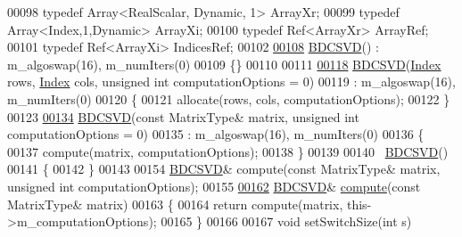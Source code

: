\begin{DoxyCode}
00098   \textcolor{keyword}{typedef} Array<RealScalar, Dynamic, 1> ArrayXr;
00099   \textcolor{keyword}{typedef} Array<Index,1,Dynamic> ArrayXi;
00100   \textcolor{keyword}{typedef} Ref<ArrayXr> ArrayRef;
00101   \textcolor{keyword}{typedef} Ref<ArrayXi> IndicesRef;
00102 
\hyperlink{group___s_v_d___module_a39514816d38f9c418cf3f3514b511c2c}{00108}   \hyperlink{group___s_v_d___module_a39514816d38f9c418cf3f3514b511c2c}{BDCSVD}() : m\_algoswap(16), m\_numIters(0)
00109   \{\}
00110 
00111 
\hyperlink{group___s_v_d___module_a3e1fa48b3d042b7daf7392724a68bb60}{00118}   \hyperlink{group___s_v_d___module_a3e1fa48b3d042b7daf7392724a68bb60}{BDCSVD}(\hyperlink{namespace_eigen_a62e77e0933482dafde8fe197d9a2cfde}{Index} rows, \hyperlink{namespace_eigen_a62e77e0933482dafde8fe197d9a2cfde}{Index} cols, \textcolor{keywordtype}{unsigned} \textcolor{keywordtype}{int} computationOptions = 0)
00119     : m\_algoswap(16), m\_numIters(0)
00120   \{
00121     allocate(rows, cols, computationOptions);
00122   \}
00123 
\hyperlink{group___s_v_d___module_a302746d9c534cd513c1df87c7ae4850d}{00134}   \hyperlink{group___s_v_d___module_a302746d9c534cd513c1df87c7ae4850d}{BDCSVD}(\textcolor{keyword}{const} MatrixType& matrix, \textcolor{keywordtype}{unsigned} \textcolor{keywordtype}{int} computationOptions = 0)
00135     : m\_algoswap(16), m\_numIters(0)
00136   \{
00137     compute(matrix, computationOptions);
00138   \}
00139 
00140   ~\hyperlink{group___s_v_d___module_class_eigen_1_1_b_d_c_s_v_d}{BDCSVD}() 
00141   \{
00142   \}
00143   
00154   \hyperlink{group___s_v_d___module_class_eigen_1_1_b_d_c_s_v_d}{BDCSVD}& compute(\textcolor{keyword}{const} MatrixType& matrix, \textcolor{keywordtype}{unsigned} \textcolor{keywordtype}{int} computationOptions);
00155 
\hyperlink{group___s_v_d___module_acf27f41ed044d74ea8e8cbaf17ffdb04}{00162}   \hyperlink{group___s_v_d___module_class_eigen_1_1_b_d_c_s_v_d}{BDCSVD}& \hyperlink{group___s_v_d___module_acf27f41ed044d74ea8e8cbaf17ffdb04}{compute}(\textcolor{keyword}{const} MatrixType& matrix)
00163   \{
00164     \textcolor{keywordflow}{return} compute(matrix, this->m\_computationOptions);
00165   \}
00166 
00167   \textcolor{keywordtype}{void} setSwitchSize(\textcolor{keywordtype}{int} s) 

\end{DoxyCode}
